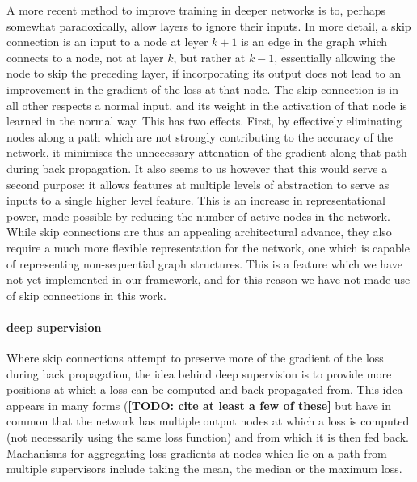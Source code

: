 \documentclass[msc]{infthesis}
\newcommand{\TODO}[1]{\textbf{[TODO: {#1}]}}
\begin{document}
A more recent method to improve training in deeper networks is to, perhaps somewhat
paradoxically, allow layers to ignore their inputs.  In more detail, a skip connection is an
input to a node at leyer \(k + 1\) is an edge in the graph which connects to a node, not at
layer \(k\), but rather at \(k-1\), essentially allowing the node to skip the preceding layer,
if incorporating its output does not lead to an improvement in the gradient of the loss at that
node.  The skip connection is in all other respects a normal input, and its weight in the
activation of that node is learned in the normal way.
%
\cite{he2016identity}
%
This has two effects.  First, by
effectively eliminating nodes along a path which are not strongly contributing to the accuracy
of the network, it minimises the unnecessary attenation of the gradient along that path during
back propagation.  It also seems to us however that this would serve a second purpose: it allows
features at multiple levels of abstraction to serve as inputs to a single higher level feature.
This is an increase in representational power, made possible by reducing the number of active
nodes in the network.  While skip connections are thus an appealing architectural advance, they
also require a much more flexible representation for the network, one which is capable of
representing non-sequential graph structures.  This is a feature which we have not yet
implemented in our framework, and for this reason we have not made use of skip connections
in this work.



\paragraph*{deep supervision}
%
Where skip connections attempt to preserve more of the gradient of the loss during back
propagation, the idea behind deep supervision is to provide more positions at which a
loss can be computed and back propagated from.  This idea appears in many forms (\TODO{cite
  at least a few of these} but have in common that the network has multiple output nodes at
which a loss is computed (not necessarily using the same loss function) and from which it is
then fed back.  Machanisms for aggregating loss gradients at nodes which lie on a path from
multiple supervisors include taking the mean, the median or the maximum loss.
%
\cite{lee2015deeply}



\end{document}
